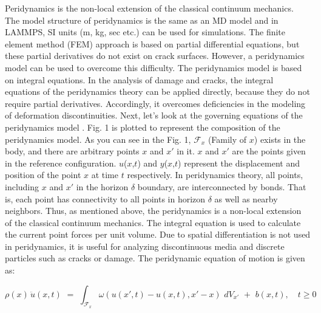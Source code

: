 Peridynamics is the non-local extension of the classical continuum mechanics. The model structure of peridynamics is the same as an MD model and in LAMMPS, SI units (m, kg, sec etc.) can be used for simulations.
The finite element method (FEM) approach is based on partial differential equations, but these partial derivatives do not exist on crack surfaces.
However, a peridynamics model can be used to overcome this difficulty.
The peridynamics model is based on integral equations.
In the analysis of damage and cracks, the integral equations of the peridynamics theory can be applied directly, because they do not require partial derivatives.
Accordingly, it overcomes deficiencies in the modeling of deformation discontinuities.
Next, let's look at the governing equations of the peridynamics model \cite{Ref2,Ref3,Ref4}.
Fig. 1 is plotted to represent the composition of the peridynamics model.
As you can see in the Fig. 1, $\mathcal{F}_x$ (Family of $x$) exists in the body, and there are arbitrary points $x$ and ${x'}$ in it. %
$x$ and ${x'}$ are the points given in the reference configuration. $u$($x$,$t$) and $y$($x$,$t$) represent the displacement and position of the point $x$ at time $t$ respectively. In peridynamics theory, all points, including $x$ and ${x'}$ in the horizon $\delta$ boundary, are interconnected by bonds.
That is, each point has connectivity to all points in horizon $\delta$ as well as nearby neighbors. Thus, as mentioned above, the peridynamics is a non-local extension of the classical continuum mechanics.
The integral equation is used to calculate the current point forces per unit volume.
Due to spatial differentiation is not used in peridynamics, it is useful for analyzing discontinuous media and discrete particles such as cracks or damage.
The peridynamic equation of motion is given as:

\begin{equation}
\rho(x) \, \ddot{u}(x,t) \, \, = \, \, \int_{\mathcal{F}_x} \omega\left(u(x',t)-u(x,t),x'-x\right) \, \, dV_{x'} \, \, + \, \, b(x,t), \quad t\geq0
\end{equation}

